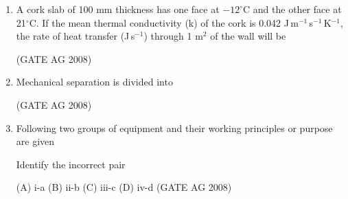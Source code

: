 \documentclass[journal,12pt,onecolumn]{IEEEtran}
\begin{document}
\begin{enumerate}
\medskip

\item 
 A cork slab of 100 mm thickness has one face at $-12^\circ$C and the other face at 21${}^\circ$C. If the mean thermal conductivity (k) of the cork is 0.042 J\,m$^{-1}$\,s$^{-1}$\,K$^{-1}$, the rate of heat transfer (J\,s$^{-1}$) through 1 m$^2$ of the wall will be
\begin{enumerate}
\end{enumerate}
\hfill(GATE AG 2008)\\

\medskip

\item 
 Mechanical separation is divided into
\begin{enumerate}
\end{enumerate}
\hfill(GATE AG 2008)\\

\medskip

\item 
 Following two groups of equipment and their working principles or purpose are given
 


\medskip

Identify the incorrect pair

(A) i-a \quad (B) ii-b \quad (C) iii-c \quad (D) iv-d
\hfill(GATE AG 2008)\\


\end{enumerate}
\end{document}
